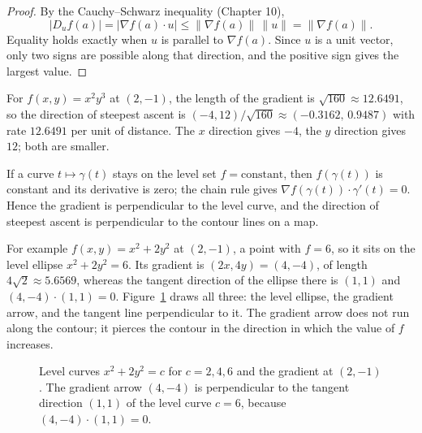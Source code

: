 \begin{proof}
By the Cauchy--Schwarz inequality (Chapter 10),
\[
  |D_{u}f(a)|=|\nabla f(a)\cdot u|\le\|\nabla f(a)\|\,\|u\|=\|\nabla f(a)\|.
\]
Equality holds exactly when $u$ is parallel to $\nabla f(a)$. Since $u$ is a unit vector, only
two signs are possible along that direction, and the positive sign gives the largest value.
\end{proof}

For $f(x,y)=x^{2}y^{3}$ at $(2,-1)$, the length of the gradient is $\sqrt{160}\approx12.6491$,
so the direction of steepest ascent is $(-4,12)/\sqrt{160}\approx(-0.3162,\,0.9487)$ with
rate $12.6491$ per unit of distance. The $x$ direction gives $-4$, the $y$ direction gives
$12$; both are smaller.

If a curve $t\mapsto\gamma(t)$ stays on the level set $f=\text{constant}$, then
$f(\gamma(t))$ is constant and its derivative is zero; the chain rule gives
$\nabla f(\gamma(t))\cdot\gamma'(t)=0$. Hence the gradient is perpendicular to the level
curve, and the direction of steepest ascent is perpendicular to the contour lines on a map.

For example $f(x,y)=x^{2}+2y^{2}$ at $(2,-1)$, a point with $f=6$, so it sits on the level
ellipse $x^{2}+2y^{2}=6$. Its gradient is $(2x,4y)=(4,-4)$, of length
$4\sqrt{2}\approx5.6569$, whereas the tangent direction of the ellipse there is $(1,1)$ and
$(4,-4)\cdot(1,1)=0$. Figure~\ref{fig:kontur-gradien} draws all three: the level ellipse, the
gradient arrow, and the tangent line perpendicular to it. The gradient arrow does not run
along the contour; it pierces the contour in the direction in which the value of $f$
increases.

\begin{figure}[htbp]
\centering
{}
\caption{Level curves $x^{2}+2y^{2}=c$ for $c=2,4,6$ and the gradient at $(2,-1)$. The
gradient arrow $(4,-4)$ is perpendicular to the tangent direction $(1,1)$ of the level curve
$c=6$, because $(4,-4)\cdot(1,1)=0$.}
\label{fig:kontur-gradien}
\end{figure}

